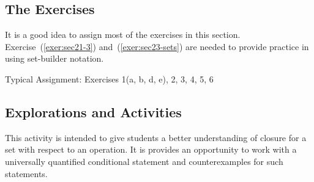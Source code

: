 \subsection*{The Exercises}

It is a good idea to assign most of the exercises in this section.  Exercise~(\ref{exer:sec21-3}) and~(\ref{exer:sec23-sets}) are needed to provide practice in using set-builder notation.  %

\vskip6pt
\noindent
Typical Assignment:  Exercises 1(a, b, d, e), 2, 3, 4, 5, 6
\hbreak


\subsection*{Explorations and Activities}
This activity is intended to give students a better understanding of closure for a set with respect to an operation.  It is provides an opportunity to work with a universally quantified conditional statement and counterexamples for such statements.
\hbreak


\endinput
